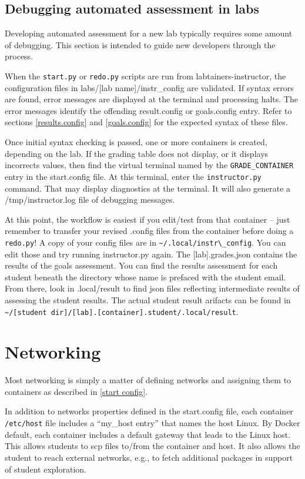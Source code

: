 \documentclass[12pt]{article}
\begin{document}
\subsection{Debugging automated assessment in labs}
Developing automated assessment for a new lab typically requires some
amount of debugging.  This section is intended to guide new developers
through the process.

When the {\tt start.py} or {\tt redo.py} scripts are run from labtainers-instructor,
the configuration files in labs/[lab name]/instr\_config are validated.
If syntax errors are found, error messages are displayed at the terminal
and processing halts.  The error messages identify the offending result.config
or goals.config entry.  Refer to sections \ref{results.config} and \ref{goals.config} 
for the expected syntax of these files.

Once initial syntax checking is passed, one or more containers is created,
depending on the lab.  If the grading table does not display, or it displays
incorrects values, then find the virtual terminal named by the {\tt GRADE\_CONTAINER}
entry in the start.config file.  At this terminal, enter the {\tt instructor.py}
command.  That may display diagnostics at the terminal.  It will also generate
a /tmp/instructor.log file of debugging messages. 

At this point, the workflow is easiest if you edit/test from that container --
just remember to transfer your revised .config files from the container before
doing a {\tt redo.py}!  A copy of your config files are in \verb!~/.local/instr\_config!.  You can edit
those and try running instructor.py again.  The [lab].grades.json contains the
results of the goals assessment.  You can find the results assessment for each 
student beneath the directory whose name is prefaced with the student email.  
From there, look in .local/result to find json files reflecting intermediate 
results of assessing the student results.  The actual student result arifacts
can be found in \verb!~/[student dir]/[lab].[container].student/.local/result!. 
\section{Networking}
Most networking is simply a matter of defining networks and assigning them to containers
as described in \ref{start config}.  

In addition to networks properties defined in the
start.config file, each container \texttt{/etc/host} file includes a ``my\_host entry'' that names
the host Linux.  By Docker default, each container includes a default gateway that
leads to the Linux host.  This allows students to scp files to/from the container and host.
It also allows the student to reach external networks, e.g., to fetch additional packages in
support of student exploration.
\end{document}
